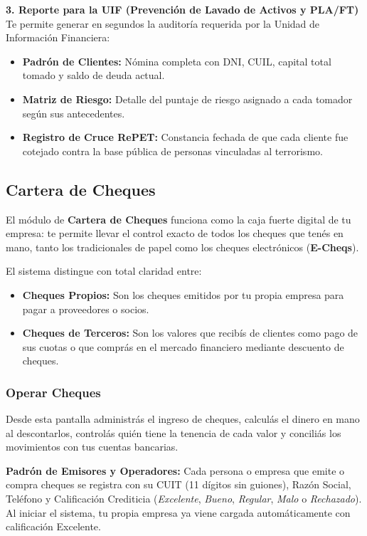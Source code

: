\documentclass[12pt,a4paper]{article}
\renewcommand{\_}{\textunderscore\allowbreak}
\begin{document}
\textbf{3. Reporte para la UIF (Prevención de Lavado de Activos y PLA/FT)}
Te permite generar en segundos la auditoría requerida por la Unidad de Información Financiera:
\begin{itemize}
    \item \textbf{Padrón de Clientes:} Nómina completa con DNI, CUIL, capital total tomado y saldo de deuda actual.
    \item \textbf{Matriz de Riesgo:} Detalle del puntaje de riesgo asignado a cada tomador según sus antecedentes.
    \item \textbf{Registro de Cruce RePET:} Constancia fechada de que cada cliente fue cotejado contra la base pública de personas vinculadas al terrorismo.
\end{itemize}

\subsection{Cartera de Cheques}

El módulo de \textbf{Cartera de Cheques} funciona como la caja fuerte digital de tu empresa: te permite llevar el control exacto de todos los cheques que tenés en mano, tanto los tradicionales de papel como los cheques electrónicos (\textbf{E-Cheqs}). 

El sistema distingue con total claridad entre:
\begin{itemize}
    \item \textbf{Cheques Propios:} Son los cheques emitidos por tu propia empresa para pagar a proveedores o socios.
    \item \textbf{Cheques de Terceros:} Son los valores que recibís de clientes como pago de sus cuotas o que comprás en el mercado financiero mediante descuento de cheques.
\end{itemize}

\subsubsection{Operar Cheques}
Desde esta pantalla administrás el ingreso de cheques, calculás el dinero en mano al descontarlos, controlás quién tiene la tenencia de cada valor y conciliás los movimientos con tus cuentas bancarias.

\textbf{Padrón de Emisores y Operadores:}
Cada persona o empresa que emite o compra cheques se registra con su CUIT (11 dígitos sin guiones), Razón Social, Teléfono y Calificación Crediticia (\textit{Excelente}, \textit{Bueno}, \textit{Regular}, \textit{Malo} o \textit{Rechazado}). Al iniciar el sistema, tu propia empresa ya viene cargada automáticamente con calificación Excelente.
\end{document}
